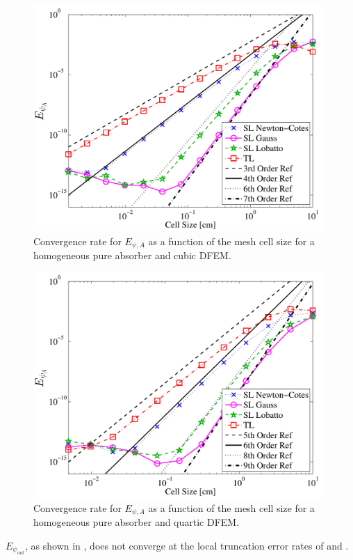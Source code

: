 \begin{figure}[!hbp]
\centering
\includegraphics[width=11cm]{chapter2_constant_xs/Cubic_L2A_err-eps-converted-to.pdf}
\caption{Convergence rate for $E_{\psi,A}$ as a function of the mesh cell size for a homogeneous pure absorber and cubic DFEM.}
\label{fig:multi_L2A_p3}
\end{figure}
\begin{figure}[!htp]
\centering
\includegraphics[width=11cm]{chapter2_constant_xs/Quartic_L2A_err-eps-converted-to.pdf}
\caption{Convergence rate for $E_{\psi,A}$ as a function of the mesh cell size for a homogeneous pure absorber and quartic DFEM.}
\label{fig:multi_L2A_p4}
\end{figure}
$E_{\psi_{out}}$, as shown in , does not converge at the local truncation error rates of  and .  
%

